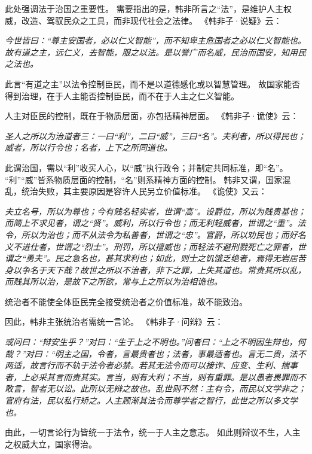 \documentclass[11pt]{article}
\begin{document}
此处强调法于治国之重要性。
需要指出的是，韩非所言之“法”，是维护人主权威，改造、驾驭民众之工具，而非现代社会之法律。
《韩非子·说疑》云：

\textit{今世皆曰：“尊主安国者，必以仁义智能”，而不知卑主危国者之必以仁义智能也。故有道之主，远仁义，去智能，服之以法。是以誉广而名威，民治而国安，知用民之法也。}

此言“有道之主”以法令控制臣民，而不是以道德感化或以智慧管理。
故国家能否得到治理，在于人主能否控制臣民，而不在于人主之仁义智能。

\par

人主对臣民的控制，既在于物质层面，亦包括精神层面。
《韩非子·诡使》云：
  
\textit{圣人之所以为治道者三：一曰“利”，二曰“威”，三曰“名”。夫利者，所以得民也；威者，所以行令也；名者，上下之所同道也。}

此谓治国，需以“利”收买人心，以“威”执行政令；并制定共同标准，即“名”。
“利”“威”皆系物质层面的控制，“名”则系精神方面的控制。
韩非又谓，国家混乱，统治失败，其主要原因是容许人民另立价值标准。
《诡使》又云：

\textit{夫立名号，所以为尊也；今有贱名轻实者，世谓“高”。设爵位，所以为贱贵基也；而简上不求见者，谓之“贤”。威利，所以行令也；而无利轻威者，世谓之“重”。法令，所以为治也；而不从法令为私善者，世谓之“忠”。官爵，所以劝民也；而好名义不进仕者，世谓之“烈士”。刑罚，所以擅威也；而轻法不避刑戮死亡之罪者，世谓之“勇夫”。民之急名也，甚其求利也；如此，则士之饥饿乏绝者，焉得无岩居苦身以争名于天下哉？故世之所以不治者，非下之罪，上失其道也。常贵其所以乱，而贱其所以治，是故下之所欲，常与上之所以为治相诡也。}

统治者不能使全体臣民完全接受统治者之价值标准，故不能致治。

\par

因此，韩非主张统治者需统一言论。
《韩非子·问辩》云：

\textit{或问曰：“辩安生乎？”对曰：“生于上之不明也。”问者曰：“上之不明因生辩也，何哉？”对曰：“明主之国，令者，言最贵者也；法者，事最适者也。言无二贵，法不两适，故言行而不轨于法令者必禁。若其无法令而可以接诈、应变、生利、揣事者，上必采其言而责其实。言当，则有大利；不当，则有重罪。是以愚者畏罪而不敢言，智者无以讼。此所以无辩之故也。乱世则不然：主有令，而民以文学非之；官府有法，民以私行矫之。人主顾渐其法令而尊学者之智行，此世之所以多文学也。}

由此，一切言论行为皆统一于法令，统一于人主之意志。
如此则辩议不生，人主之权威大立，国家得治。

\par
\end{document}
